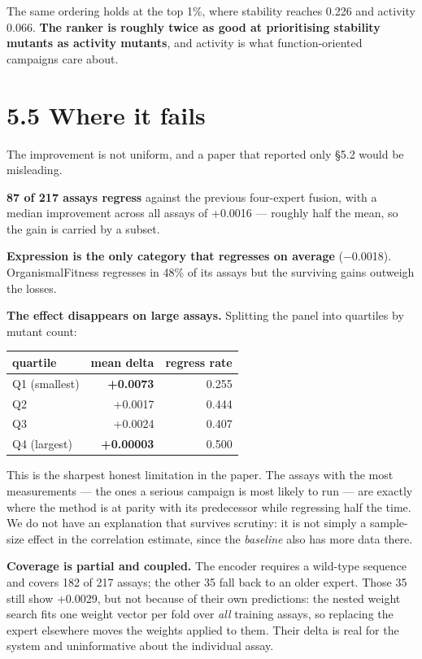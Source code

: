 \documentclass[sigconf,review,nonacm]{acmart}
\begin{document}
The same ordering holds at the top 1\%, where stability reaches 0.226 and activity 0.066. \textbf{The ranker is
roughly twice as good at prioritising stability mutants as activity mutants}, and activity is what
function-oriented campaigns care about.

\hypertarget{where-it-fails}{%
\section{5.5 Where it fails}\label{where-it-fails}}

The improvement is not uniform, and a paper that reported only §5.2 would be misleading.

\textbf{87 of 217 assays regress} against the previous four-expert fusion, with a median improvement across
all assays of +0.0016 --- roughly half the mean, so the gain is carried by a subset.

\textbf{Expression is the only category that regresses on average} (−0.0018). OrganismalFitness regresses in
48\% of its assays but the surviving gains outweigh the losses.

\textbf{The effect disappears on large assays.} Splitting the panel into quartiles by mutant count:

\begin{table}[t]
\centering
\small
\begin{tabular}{lrr}
\hline
quartile & mean delta & regress rate \\
\hline
Q1 (smallest) & \textbf{+0.0073} & 0.255 \\
Q2 & +0.0017 & 0.444 \\
Q3 & +0.0024 & 0.407 \\
Q4 (largest) & \textbf{+0.00003} & 0.500 \\
\hline
\end{tabular}
\end{table}

This is the sharpest honest limitation in the paper. The assays with the most measurements --- the ones a
serious campaign is most likely to run --- are exactly where the method is at parity with its predecessor
while regressing half the time. We do not have an explanation that survives scrutiny: it is not simply a
sample-size effect in the correlation estimate, since the \emph{baseline} also has more data there.

\textbf{Coverage is partial and coupled.} The encoder requires a wild-type sequence and covers 182 of 217
assays; the other 35 fall back to an older expert. Those 35 still show +0.0029, but not because of their
own predictions: the nested weight search fits one weight vector per fold over \emph{all} training assays, so
replacing the expert elsewhere moves the weights applied to them. Their delta is real for the system and
uninformative about the individual assay.
\end{document}
